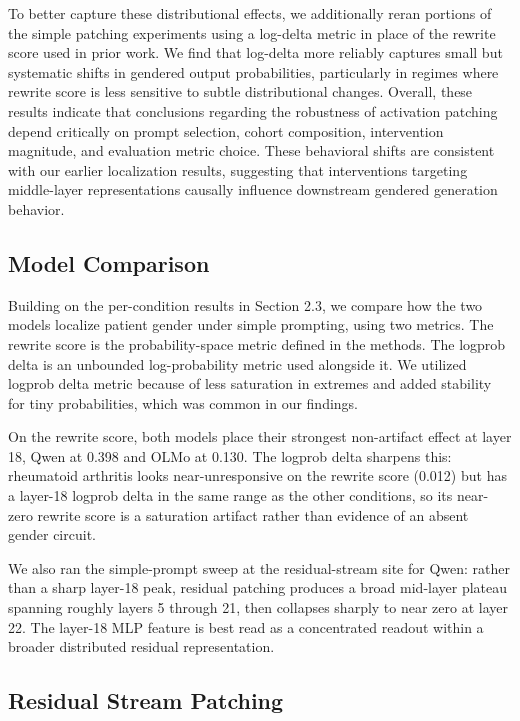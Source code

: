 \documentclass[11pt]{article}
\begin{document}
To better capture these distributional effects, we additionally reran portions of the simple patching experiments using a log-delta metric in place of the rewrite score used in prior work. We find that log-delta more reliably captures small but systematic shifts in gendered output probabilities, particularly in regimes where rewrite score is less sensitive to subtle distributional changes. Overall, these results indicate that conclusions regarding the robustness of activation patching depend critically on prompt selection, cohort composition, intervention magnitude, and evaluation metric choice. These behavioral shifts are consistent with our earlier localization results, suggesting that interventions targeting middle-layer representations causally influence downstream gendered generation behavior.


\subsection{Model Comparison}
Building on the per-condition results in Section 2.3, we compare how the two models localize patient gender under simple prompting, using two metrics. The rewrite score is the probability-space metric defined in the methods. The logprob delta is an unbounded log-probability metric used alongside it. We utilized logprob delta metric because of less saturation in extremes and added stability for tiny probabilities, which was common in our findings.


On the rewrite score, both models place their strongest non-artifact effect at layer 18, Qwen at 0.398 and OLMo at 0.130. The logprob delta sharpens this: rheumatoid arthritis looks near-unresponsive on the rewrite score (0.012) but has a layer-18 logprob delta in the same range as the other conditions, so its near-zero rewrite score is a saturation artifact rather than evidence of an absent gender circuit. 

We also ran the simple-prompt sweep at the residual-stream site for Qwen: rather than a sharp layer-18 peak, residual patching produces a broad mid-layer plateau spanning roughly layers 5 through 21, then collapses sharply to near zero at layer 22. The layer-18 MLP feature is best read as a concentrated readout within a broader distributed residual representation.

\subsection{Residual Stream Patching}
\end{document}
